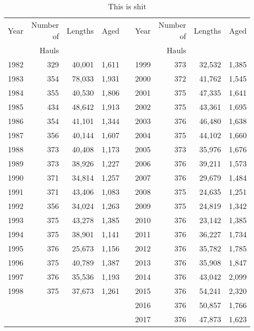 \documentclass[]{article}
\begin{document}
\begin{table}[ht]
\centering
\caption{This is shit}
\label{tab:shit}
\begin{tabular}{crrrrrrrr}
\hline
Year & Number of & Lengths & Aged &  & Year & Number of & Lengths & Aged \\
     & Hauls &  &  &  &  & Hauls &  &  \\
\hline
1982 & 329 & 40,001 & 1,611 &  & 1999 & 373 & 32,532 & 1,385 \\
1983 & 354 & 78,033 & 1,931 &  & 2000 & 372 & 41,762 & 1,545 \\
1984 & 355 & 40,530 & 1,806 &  & 2001 & 375 & 47,335 & 1,641 \\
1985 & 434 & 48,642 & 1,913 &  & 2002 & 375 & 43,361 & 1,695 \\
1986 & 354 & 41,101 & 1,344 &  & 2003 & 376 & 46,480 & 1,638 \\
1987 & 356 & 40,144 & 1,607 &  & 2004 & 375 & 44,102 & 1,660 \\
1988 & 373 & 40,408 & 1,173 &  & 2005 & 373 & 35,976 & 1,676 \\
1989 & 373 & 38,926 & 1,227 &  & 2006 & 376 & 39,211 & 1,573 \\
1990 & 371 & 34,814 & 1,257 &  & 2007 & 376 & 29,679 & 1,484 \\
1991 & 371 & 43,406 & 1,083 &  & 2008 & 375 & 24,635 & 1,251 \\
1992 & 356 & 34,024 & 1,263 &  & 2009 & 375 & 24,819 & 1,342 \\
1993 & 375 & 43,278 & 1,385 &  & 2010 & 376 & 23,142 & 1,385 \\
1994 & 375 & 38,901 & 1,141 &  & 2011 & 376 & 36,227 & 1,734 \\
1995 & 376 & 25,673 & 1,156 &  & 2012 & 376 & 35,782 & 1,785 \\
1996 & 375 & 40,789 & 1,387 &  & 2013 & 376 & 35,908 & 1,847 \\
1997 & 376 & 35,536 & 1,193 &  & 2014 & 376 & 43,042 & 2,099 \\
1998 & 375 & 37,673 & 1,261 &  & 2015 & 376 & 54,241 & 2,320 \\
     &     &        &       &  & 2016 & 376 & 50,857 & 1,766 \\
     &     &        &       &  & 2017 & 376 & 47,873 & 1,623 \\
\hline
\end{tabular}
\end{table}

\clearpage
\end{document}
